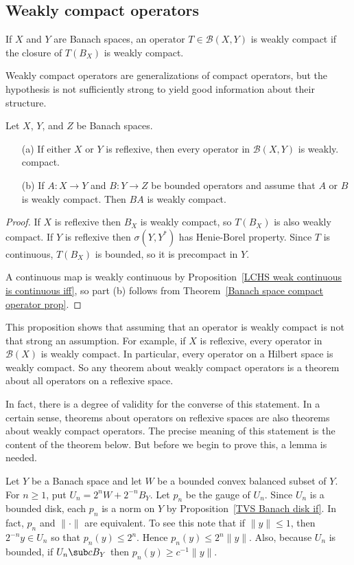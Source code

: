 \subsection{Weakly compact operators}
\begin{definition}
If $X$ and $Y$ are Banach spaces, an operator $T\in\mathcal{B}(X,Y)$ is weakly compact if the closure of $T(B_X)$ is weakly compact.
\end{definition}
Weakly compact operators are generalizations of compact operators, but the hypothesis is not sufficiently strong to yield good information about their structure.
\begin{proposition}\label{Banach space weakly compact operator prop}
Let $X$, $Y$, and $Z$ be Banach spaces.
\begin{itemize}
\item[(a)] If either $X$ or $Y$ is reflexive, then every operator in $\mathcal{B}(X,Y)$ is weakly.
compact.
\item[(b)] If $A:X\to Y$ and $B:Y\to Z$ be bounded operators and assume that $A$ or $B$ is weakly compact. Then $BA$ is weakly compact.
\end{itemize}
\end{proposition}
\begin{proof}
If $X$ is reflexive then $B_X$ is weakly compact, so $T(B_X)$ is also weakly compact. If $Y$ is reflexive then $\sigma(Y,Y^*)$ has Henie-Borel property. Since $T$ is continuous, $T(B_X)$ is bounded, so it is precompact in $Y$.\par
A continuous map is weakly continuous by Proposition~\ref{LCHS weak continuous is continuous iff}, so part (b) follows from Theorem~\ref{Banach space compact operator prop}. 
\end{proof}
This proposition shows that assuming that an operator is weakly compact
is not that strong an assumption. For example, if $X$ is reflexive, every operator in $\mathcal{B}(X)$ is weakly compact. In particular, every operator on a Hilbert space is weakly compact. So any theorem about weakly compact operators is a theorem about all operators on a reflexive space.\par
In fact, there is a degree of validity for the converse of this statement. In a certain sense, theorems about operators on reflexive spaces are also theorems about weakly compact operators. The precise meaning of this statement is the content of the theorem below. But before we begin to prove this, a lemma is needed.\par
Let $Y$ be a Banach space and let $W$ be a bounded convex balanced subset of $Y$. For $n\geq 1$, put $U_n=2^{n}W+2^{-n}B_Y$. Let $p_n$ be the gauge of $U_n$. Since $U_n$ is a bounded disk, each $p_n$ is a norm on $Y$ by Proposition~\ref{TVS Banach disk if}. In fact, $p_n$ and $\|\cdot\|$ are equivalent. To see this note that if $\|y\|\leq 1$, then $2^{-n}y\in U_n$ so that $p_n(y)\leq 2^n$. Hence $p_n(y)\leq 2^n\|y\|$. Also, because $U_n$ is bounded, if $U_n\sub cB_Y$ then $p_n(y)\geq c^{-1}\|y\|$.
